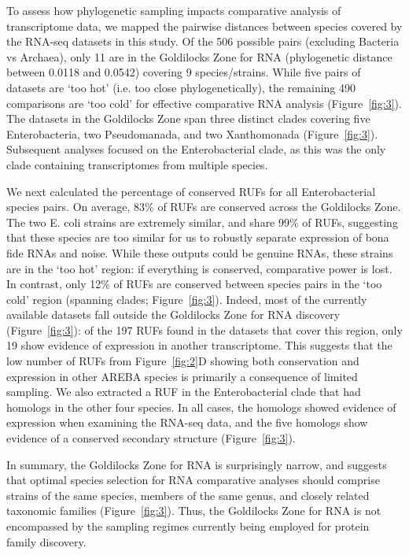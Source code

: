 \documentclass[10pt]{article}
\begin{document}
To assess how phylogenetic sampling impacts comparative analysis of
transcriptome data, we mapped the pairwise distances between species
covered by the RNA-seq datasets in this study. Of the 506 possible
pairs (excluding Bacteria vs Archaea), only 11 are in the Goldilocks
Zone for RNA (phylogenetic distance between 0.0118 and 0.0542)
covering 9 species/strains. While five pairs of datasets are ‘too hot’
(i.e. too close phylogenetically), the remaining 490 comparisons are
‘too cold’ for effective comparative RNA analysis (Figure~\ref{fig:3}). The
datasets in the Goldilocks Zone span three distinct clades covering
five Enterobacteria, two Pseudomanada, and two Xanthomonada
(Figure~\ref{fig:3}). Subsequent analyses focused on the Enterobacterial clade, as
this was the only clade containing transcriptomes from multiple
species.

We next calculated the percentage of conserved RUFs for all
Enterobacterial species pairs. On average, 83\% of RUFs are conserved
across the Goldilocks Zone. The two E. coli strains are extremely
similar, and share 99\% of RUFs, suggesting that these species are too
similar for us to robustly separate expression of bona fide RNAs and
noise. While these outputs could be genuine RNAs, these strains are in
the ‘too hot’ region: if everything is conserved, comparative power is
lost. In contrast, only 12\% of RUFs are conserved between species
pairs in the ‘too cold’ region (spanning clades; Figure~\ref{fig:3}). Indeed, most
of the currently available datasets fall outside the Goldilocks Zone
for RNA discovery (Figure~\ref{fig:3}): of the 197 RUFs found in the datasets that
cover this region, only 19 show evidence of expression in another
transcriptome. This suggests that the low number of RUFs from Figure~\ref{fig:2}D
showing both conservation and expression in other AREBA species is
primarily a consequence of limited sampling. We also extracted a RUF
in the Enterobacterial clade that had homologs in the other four
species. In all cases, the homologs showed evidence of expression when
examining the RNA-seq data, and the five homologs show evidence of a
conserved secondary structure (Figure~\ref{fig:3}).

In summary, the Goldilocks Zone for RNA is surprisingly narrow, and
suggests that optimal species selection for RNA comparative analyses
should comprise strains of the same species, members of the same
genus, and closely related taxonomic families (Figure~\ref{fig:3}). Thus, the
Goldilocks Zone for RNA is not encompassed by the sampling regimes
currently being employed for protein family discovery.
\end{document}
